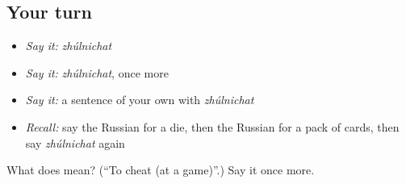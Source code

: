 \subsection*{Your turn}
\begin{itemize}
\raggedright
  \item \emph{Say it:} \emph{zhúlnichat}
  \item \emph{Say it:} \emph{zhúlnichat}, once more
  \item \emph{Say it:} a sentence of your own with \emph{zhúlnichat}
  \item \emph{Recall:} say the Russian for a die, then the Russian for a pack of cards, then say \emph{zhúlnichat} again
\end{itemize}

\begin{tcolorbox}[breakable,colback=teal!4,colframe=teal!35!black,title={Before you move on}]
What does  mean? (\textquotedblleft{}To cheat (at a game)\textquotedblright{}.) Say it once more.
\end{tcolorbox}
